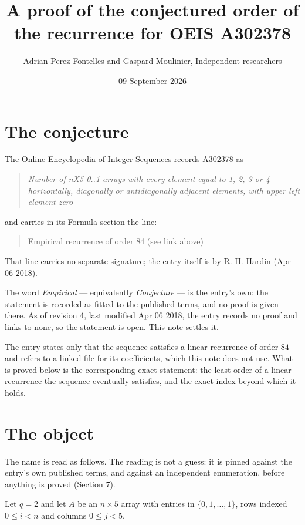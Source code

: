 \documentclass[11pt]{article}
\title{A proof of the conjectured order of the recurrence for OEIS A302378}
\author{Adrian Perez Fontelles and Gaspard Moulinier, Independent researchers}
\date{09 September 2026}
\theoremstyle{definition}
\begin{document}
\maketitle
\section{The conjecture}

The Online Encyclopedia of Integer Sequences records \href{https://oeis.org/A302378}{A302378} as

\begin{quote}\itshape Number of nX5 0..1 arrays with every element equal to 1, 2, 3 or 4 horizontally, diagonally or antidiagonally adjacent elements, with upper left element zero\end{quote}

and carries in its Formula section the line:

\begin{quote}\ttfamily Empirical recurrence of order 84 (see link above)\end{quote}

That line carries no separate signature; the entry itself is by R. H. Hardin (Apr 06 2018).

The word {\itshape Empirical} --- equivalently {\itshape Conjecture} --- is the entry's own: the statement is recorded as fitted to the published terms, and no proof is given there. As of revision 4, last modified Apr 06 2018, the entry records no proof and links to none, so the statement is open. This note settles it.

The entry states only that the sequence satisfies a linear recurrence of order $84$ and refers to a linked file for its coefficients, which this note does not use. What is proved below is the corresponding exact statement: the least order of a linear recurrence the sequence eventually satisfies, and the exact index beyond which it holds.

\section{The object}

The name is read as follows. The reading is not a guess: it is pinned against the entry's own published terms, and against an independent enumeration, before anything is proved (Section 7).

Let $q = 2$ and let $A$ be an $n \times 5$ array with entries in $\{0,1,\dots,1\}$, rows indexed $0 \le i < n$ and columns $0 \le j < 5$.
\end{document}
